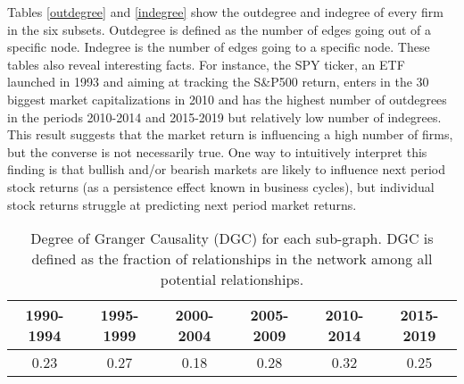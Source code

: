 Tables \ref{outdegree} and \ref{indegree} show the outdegree and indegree of every firm in the six subsets. Outdegree is defined as the number of edges going out of a specific node. Indegree is the number of edges going to a specific node.
These tables also reveal interesting facts. For instance, the SPY ticker, an ETF launched in 1993 and aiming at tracking the S\&P500 return, enters in the 30 biggest market capitalizations in 2010 and has the highest number of outdegrees in the periods 2010-2014 and 2015-2019 but relatively low number of indegrees. 
This result suggests that the market return is influencing a high number of firms, but the converse is not necessarily true. One way to intuitively interpret this finding is that bullish and/or bearish markets are likely to influence next period stock returns (as a persistence effect known in business cycles), but individual stock returns struggle at predicting next period market returns. 


\begin{table}[]
\begin{tabular}{cccccc}
\hline
\multicolumn{1}{|c|}{1990-1994} &
  \multicolumn{1}{c|}{1995-1999} &
  \multicolumn{1}{c|}{2000-2004} &
  \multicolumn{1}{c|}{2005-2009} &
  \multicolumn{1}{c|}{2010-2014} &
  \multicolumn{1}{c|}{2015-2019} \\ \hline
\multicolumn{1}{|c|}{0.23} &
  \multicolumn{1}{c|}{0.27} &
  \multicolumn{1}{c|}{0.18} &
  \multicolumn{1}{c|}{0.28} &
  \multicolumn{1}{c|}{0.32} &
  \multicolumn{1}{c|}{0.25} \\ \hline

\end{tabular}
\caption{Degree of Granger Causality (DGC) for each sub-graph. DGC is defined as the fraction of relationships in the network among all potential relationships.}
\label{GrangerCausality}
\end{table}

    
